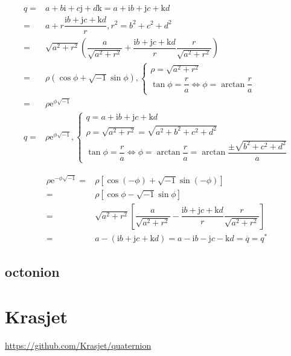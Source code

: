 \documentclass[
]{book}
\theoremstyle{definition}
\theoremstyle{definition}
\theoremstyle{definition}
\theoremstyle{definition}
\theoremstyle{remark}
\begin{document}
\[
\begin{aligned}
q= & a+b\mathrm{i}+c\mathrm{j}+d\mathrm{k}=a+\mathrm{i}b+\mathrm{j}c+\mathrm{k}d\\
= & a+r\dfrac{\mathrm{i}b+\mathrm{j}c+\mathrm{k}d}{r},r^{2}=b^{2}+c^{2}+d^{2}\\
= & \sqrt{a^{2}+r^{2}}\left(\dfrac{a}{\sqrt{a^{2}+r^{2}}}+\dfrac{\mathrm{i}b+\mathrm{j}c+\mathrm{k}d}{r}\dfrac{r}{\sqrt{a^{2}+r^{2}}}\right)\\
= & \rho\left(\cos\phi+\sqrt{-1}\sin\phi\right),\begin{cases}
\rho=\sqrt{a^{2}+r^{2}}\\
\tan\phi=\dfrac{r}{a}\Leftrightarrow\phi=\arctan\dfrac{r}{a}
\end{cases}\\
= & \rho\mathrm{e}^{\phi\sqrt{-1}}\\
q= & \rho\mathrm{e}^{\phi\sqrt{-1}},\begin{cases}
q=a+\mathrm{i}b+\mathrm{j}c+\mathrm{k}d\\
\rho=\sqrt{a^{2}+r^{2}}=\sqrt{a^{2}+b^{2}+c^{2}+d^{2}}\\
\tan\phi=\dfrac{r}{a}\Leftrightarrow\phi=\arctan\dfrac{r}{a}=\arctan\dfrac{\pm\sqrt{b^{2}+c^{2}+d^{2}}}{a}
\end{cases}
\end{aligned}
\]

\[
\begin{aligned}
\rho\mathrm{e}^{-\phi\sqrt{-1}}= & \rho\left[\cos\left(-\phi\right)+\sqrt{-1}\sin\left(-\phi\right)\right]\\
= & \rho\left[\cos\phi-\sqrt{-1}\sin\phi\right]\\
= & \sqrt{a^{2}+r^{2}}\left[\dfrac{a}{\sqrt{a^{2}+r^{2}}}-\dfrac{\mathrm{i}b+\mathrm{j}c+\mathrm{k}d}{r}\dfrac{r}{\sqrt{a^{2}+r^{2}}}\right]\\
= & a-\left(\mathrm{i}b+\mathrm{j}c+\mathrm{k}d\right)=a-\mathrm{i}b-\mathrm{j}c-\mathrm{k}d=\overline{q}=q^{*}
\end{aligned}
\]

\subsection{octonion}\label{octonion}

\section{Krasjet}\label{krasjet}

\url{https://github.com/Krasjet/quaternion}
\end{document}
